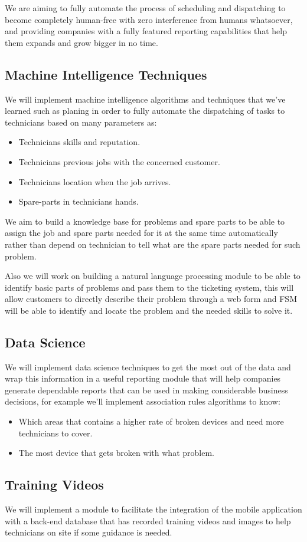 We are aiming to fully automate the process of scheduling and dispatching to become completely human-free with zero interference from humans whatsoever, and providing companies with a fully featured reporting capabilities that help them expands and grow bigger in no time.
	
\subsection{Machine Intelligence Techniques}
	We will implement machine intelligence algorithms and techniques that we've learned such as planing\cite{artificial_intelligence,} in order to fully automate the dispatching of tasks to technicians based on many parameters as:
	\begin{itemize}
		\item Technicians skills and reputation.
		\item Technicians previous jobs with the concerned customer.
		\item Technicians location when the job arrives.
		\item Spare-parts in technicians hands.
	\end{itemize}
	
	We aim to build a knowledge base for problems and spare parts to be able to assign the job and spare parts needed for it at the same time automatically rather than depend on technician to tell what are the spare parts needed for such problem.
	
	Also we will work on building a natural language processing module to be able to identify basic parts of problems and pass them to the ticketing system, this will allow customers to directly describe their problem through a web form and FSM will be able to identify and locate the problem and the needed skills to solve it.
	
\subsection{Data Science}
	We will implement data science techniques to get the most out of the data and wrap this information in a useful reporting module that will help companies generate dependable reports that can be used in making considerable business decisions, for example we'll implement association rules algorithms to know:
	\begin{itemize}
		\item Which areas that contains a higher rate of broken devices and need more technicians to cover.
		\item The most device that gets broken with what problem.
	\end{itemize}
\subsection{Training Videos}
	We will implement a module to facilitate the integration of the mobile application with a back-end database that has recorded training videos and images to help technicians on site if some guidance is needed.
	  